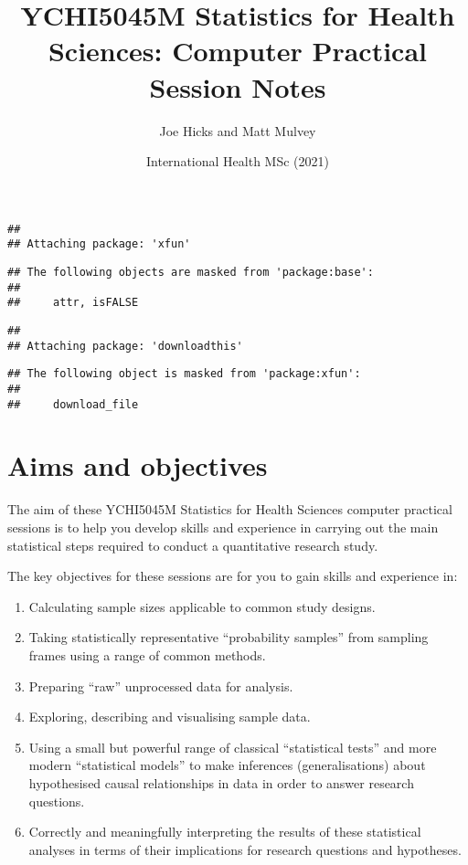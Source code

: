 \documentclass[
]{book}
\title{YCHI5045M Statistics for Health Sciences: Computer Practical Session Notes}
\author{Joe Hicks and Matt Mulvey}
\date{International Health MSc (2021)}
\begin{document}
\maketitle

{
\setcounter{tocdepth}{1}
\tableofcontents
}
\begin{verbatim}
## 
## Attaching package: 'xfun'
\end{verbatim}

\begin{verbatim}
## The following objects are masked from 'package:base':
## 
##     attr, isFALSE
\end{verbatim}

\begin{verbatim}
## 
## Attaching package: 'downloadthis'
\end{verbatim}

\begin{verbatim}
## The following object is masked from 'package:xfun':
## 
##     download_file
\end{verbatim}

\hypertarget{aims-and-objectives}{%
\chapter{Aims and objectives}\label{aims-and-objectives}}

The aim of these YCHI5045M Statistics for Health Sciences computer practical sessions is to help you develop skills and experience in carrying out the main statistical steps required to conduct a quantitative research study.

The key objectives for these sessions are for you to gain skills and experience in:

\begin{enumerate}
\def\labelenumi{\arabic{enumi}.}
\item
  Calculating sample sizes applicable to common study designs.
\item
  Taking statistically representative ``probability samples'' from sampling frames using a range of common methods.
\item
  Preparing ``raw'' unprocessed data for analysis.
\item
  Exploring, describing and visualising sample data.
\item
  Using a small but powerful range of classical ``statistical tests'' and more modern ``statistical models'' to make inferences (generalisations) about hypothesised causal relationships in data in order to answer research questions.
\item
  Correctly and meaningfully interpreting the results of these statistical analyses in terms of their implications for research questions and hypotheses.
\end{enumerate}
\end{document}

